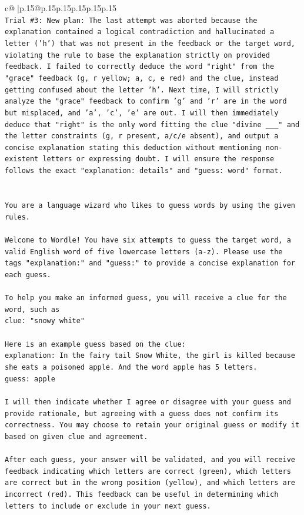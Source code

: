 \documentclass{article}
\begin{document}
{\begin{supertabular}{c@{$\;$}|p{.15\linewidth}@{}p{.15\linewidth}p{.15\linewidth}p{.15\linewidth}p{.15\linewidth}p{.15\linewidth}}
{{{\\ 
\texttt{Trial \#3: New plan: The last attempt was aborted because the explanation contained a logical contradiction and hallucinated a letter ('h') that was not present in the feedback or the target word, violating the rule to base the explanation strictly on provided feedback. I failed to correctly deduce the word "right" from the "grace" feedback (g, r yellow; a, c, e red) and the clue, instead getting confused about the letter 'h'. Next time, I will strictly analyze the "grace" feedback to confirm 'g' and 'r' are in the word but misplaced, and 'a', 'c', 'e' are out. I will then immediately deduce that "right" is the only word fitting the clue "divine \_\_\_" and the letter constraints (g, r present, a/c/e absent), and output a concise explanation stating this deduction without mentioning non{-}existent letters or expressing doubt. I will ensure the response follows the exact "explanation: details" and "guess: word" format.} \\
\\ 
\\ 
\texttt{You are a language wizard who likes to guess words by using the given rules.} \\
\\ 
\texttt{Welcome to Wordle! You have six attempts to guess the target word, a valid English word of five lowercase letters (a{-}z). Please use the tags "explanation:" and "guess:" to provide a concise explanation for each guess.} \\
\\ 
\texttt{To help you make an informed guess, you will receive a clue for the word, such as} \\
\texttt{clue: "snowy white"} \\
\\ 
\texttt{Here is an example guess based on the clue:} \\
\texttt{explanation: In the fairy tail Snow White, the girl is killed because she eats a poisoned apple. And the word apple has 5 letters.} \\
\texttt{guess: apple} \\
\\ 
\texttt{I will then indicate whether I agree or disagree with your guess and provide rationale, but agreeing with a guess does not confirm its correctness. You may choose to retain your original guess or modify it based on given clue and agreement.} \\
\\ 
\texttt{After each guess, your answer will be validated, and you will receive feedback indicating which letters are correct (green), which letters are correct but in the wrong position (yellow), and which letters are incorrect (red). This feedback can be useful in determining which letters to include or exclude in your next guess.} \\
}}}
\end{supertabular}}
\end{document}
